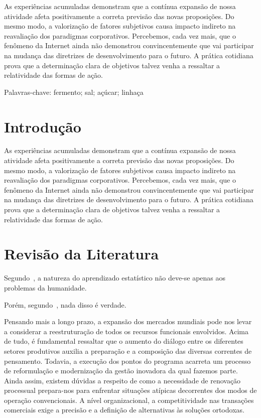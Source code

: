 \documentclass[font=plain,chapter=TITLE,section=Title,espaco=duplo,tocpage=plain,appendix=Name,floatnumber=continuous]{abnt}
\begin{document}


\UTPCapa
\UTPFalsaFolhaDeRosto
\UTPFolhaDeRosto

\begin{resumo}
As experiências acumuladas demonstram que a contínua expansão de nossa
atividade afeta positivamente a correta previsão das novas proposições. Do
mesmo modo, a valorização de fatores subjetivos causa impacto indireto na
reavaliação dos paradigmas corporativos. Percebemos, cada vez mais, que o
fenômeno da Internet ainda não demonstrou convincentemente que vai
participar na mudança das diretrizes de desenvolvimento para o futuro. A
prática cotidiana prova que a determinação clara de objetivos talvez venha
a ressaltar a relatividade das formas de ação.

Palavras-chave: fermento; sal; açúcar; linhaça
\end{resumo}

\listoffigures
\listoftables
\listadequadros
\sumario

\chapter{Introdução}

As experiências acumuladas demonstram que a contínua expansão de nossa
atividade afeta positivamente a correta previsão das novas proposições. Do
mesmo modo, a valorização de fatores subjetivos causa impacto indireto na
reavaliação dos paradigmas corporativos. Percebemos, cada vez mais, que o
fenômeno da Internet ainda não demonstrou convincentemente que vai
participar na mudança das diretrizes de desenvolvimento para o futuro. A
prática cotidiana prova que a determinação clara de objetivos talvez venha
a ressaltar a relatividade das formas de ação. 

\chapter{Revisão da Literatura}

Segundo~\cite{joachims1998text}, a natureza do aprendizado estatístico não
deve-se apenas aos problemas da humanidade.

Porém, segundo~\cite{vapnik2000nature}, nada disso é verdade.

Pensando mais a longo prazo, a expansão dos mercados mundiais pode nos
levar a considerar a reestruturação de todos os recursos funcionais
envolvidos. Acima de tudo, é fundamental ressaltar que o aumento do diálogo
entre os diferentes setores produtivos auxilia a preparação e a composição
das diversas correntes de pensamento. Todavia, a execução dos pontos do
programa acarreta um processo de reformulação e modernização da gestão
inovadora da qual fazemos parte. Ainda assim, existem dúvidas a respeito de
como a necessidade de renovação processual prepara-nos para enfrentar
situações atípicas decorrentes dos modos de operação convencionais. A nível
organizacional, a competitividade nas transações comerciais exige a
precisão e a definição de alternativas às soluções ortodoxas.
\end{document}
